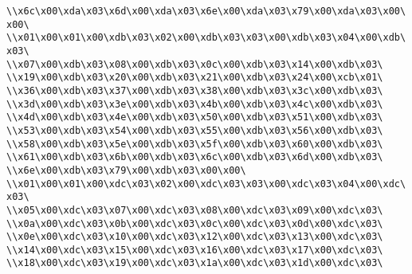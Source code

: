 \verb|\\x6c\x00\xda\x03\x6d\x00\xda\x03\x6e\x00\xda\x03\x79\x00\xda\x03\x00\x00\|\newline
\verb|\\x01\x00\x01\x00\xdb\x03\x02\x00\xdb\x03\x03\x00\xdb\x03\x04\x00\xdb\x03\|\newline
\verb|\\x07\x00\xdb\x03\x08\x00\xdb\x03\x0c\x00\xdb\x03\x14\x00\xdb\x03\|\newline
\verb|\\x19\x00\xdb\x03\x20\x00\xdb\x03\x21\x00\xdb\x03\x24\x00\xcb\x01\|\newline
\verb|\\x36\x00\xdb\x03\x37\x00\xdb\x03\x38\x00\xdb\x03\x3c\x00\xdb\x03\|\newline
\verb|\\x3d\x00\xdb\x03\x3e\x00\xdb\x03\x4b\x00\xdb\x03\x4c\x00\xdb\x03\|\newline
\verb|\\x4d\x00\xdb\x03\x4e\x00\xdb\x03\x50\x00\xdb\x03\x51\x00\xdb\x03\|\newline
\verb|\\x53\x00\xdb\x03\x54\x00\xdb\x03\x55\x00\xdb\x03\x56\x00\xdb\x03\|\newline
\verb|\\x58\x00\xdb\x03\x5e\x00\xdb\x03\x5f\x00\xdb\x03\x60\x00\xdb\x03\|\newline
\verb|\\x61\x00\xdb\x03\x6b\x00\xdb\x03\x6c\x00\xdb\x03\x6d\x00\xdb\x03\|\newline
\verb|\\x6e\x00\xdb\x03\x79\x00\xdb\x03\x00\x00\|\newline
\verb|\\x01\x00\x01\x00\xdc\x03\x02\x00\xdc\x03\x03\x00\xdc\x03\x04\x00\xdc\x03\|\newline
\verb|\\x05\x00\xdc\x03\x07\x00\xdc\x03\x08\x00\xdc\x03\x09\x00\xdc\x03\|\newline
\verb|\\x0a\x00\xdc\x03\x0b\x00\xdc\x03\x0c\x00\xdc\x03\x0d\x00\xdc\x03\|\newline
\verb|\\x0e\x00\xdc\x03\x10\x00\xdc\x03\x12\x00\xdc\x03\x13\x00\xdc\x03\|\newline
\verb|\\x14\x00\xdc\x03\x15\x00\xdc\x03\x16\x00\xdc\x03\x17\x00\xdc\x03\|\newline
\verb|\\x18\x00\xdc\x03\x19\x00\xdc\x03\x1a\x00\xdc\x03\x1d\x00\xdc\x03\|\newline
